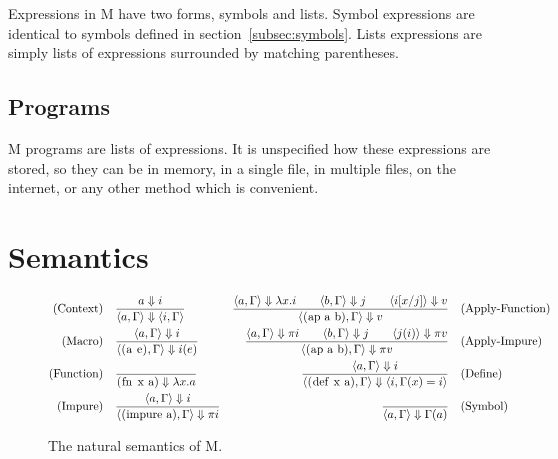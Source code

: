 \documentclass{article}
\begin{document}
\begin{multicols}{2}
        Expressions in M have two forms, symbols and lists.
        Symbol expressions are identical to symbols defined in section~\ref{subsec:symbols}.
        Lists expressions are simply lists of expressions surrounded by matching parentheses.

        \subsection{Programs}\label{subsec:programs}

        M programs are lists of expressions.
        It is unspecified how these expressions are stored, so they can be in memory, in a single file, in multiple files, on the internet, or any other method which is convenient.
    \end{multicols}
    \newpage

    \section{Semantics}\label{sec:semantics}

    \begin{figure}[h]
        \centering
        \begin{align*}
            \text{(Context)}\quad&\dfrac{a\Downarrow i}{\langle a,\Gamma\rangle\Downarrow\langle i,\Gamma\rangle}
            &\dfrac{\langle a,\Gamma\rangle\Downarrow\lambda x.i\qquad\langle b,\Gamma\rangle\Downarrow j\qquad\langle i[x/j]\rangle\Downarrow v}{\langle\lstinline$(ap a b)$,\Gamma\rangle\Downarrow v}\quad&\text{(Apply-Function)}\\
            \text{(Macro)}\quad&\dfrac{\langle a,\Gamma\rangle\Downarrow i}{\langle\lstinline$(a e)$,\Gamma\rangle\Downarrow i(e)}
            &\dfrac{\langle a,\Gamma\rangle\Downarrow\pi i\qquad\langle b,\Gamma\rangle\Downarrow j\qquad\langle j(i)\rangle\Downarrow\pi v}{\langle\lstinline$(ap a b)$,\Gamma\rangle\Downarrow\pi v}\quad&\text{(Apply-Impure)}\\
            \text{(Function)}\quad&\dfrac{}{\lstinline$(fn x a)$\Downarrow\lambda x.a}
            &\dfrac{\langle a,\Gamma\rangle\Downarrow i}{\langle\lstinline$(def x a)$,\Gamma\rangle\Downarrow\langle i,\Gamma(x) = i\rangle}\quad&\text{(Define)}\\
            \text{(Impure)}\quad&\dfrac{\langle a,\Gamma\rangle\Downarrow i}{\langle\lstinline$(impure a)$,\Gamma\rangle\Downarrow\pi i}
            &\dfrac{}{\langle a,\Gamma\rangle\Downarrow\Gamma(a)}\quad&\text{(Symbol)}
        \end{align*}
        \caption{The natural semantics of M.}
    \end{figure}
\end{document}
